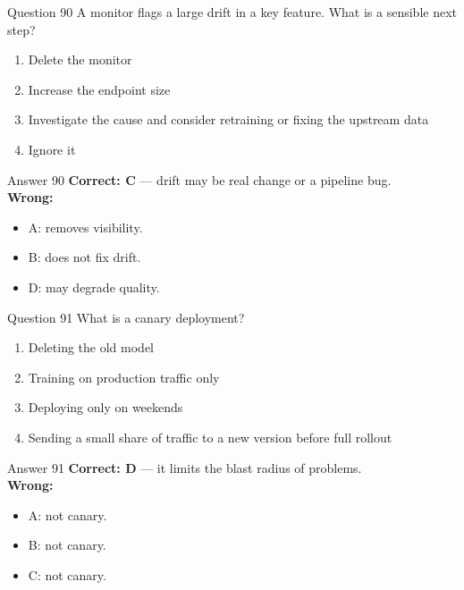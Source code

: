 \documentclass[aspectratio=169,11pt]{beamer}
\begin{document}
\begin{frame}{Question 90}
A monitor flags a large drift in a key feature. What is a sensible next step?
\begin{enumerate}[label=\Alph*.]
\item Delete the monitor
\item Increase the endpoint size
\item Investigate the cause and consider retraining or fixing the upstream data
\item Ignore it
\end{enumerate}
\end{frame}
\begin{frame}{Answer 90}
\textbf{Correct: C} --- drift may be real change or a pipeline bug.\\
\vspace{0.5em}
\textbf{Wrong:}
\begin{itemize}
\item A: removes visibility.
\item B: does not fix drift.
\item D: may degrade quality.
\end{itemize}
\end{frame}

\begin{frame}{Question 91}
What is a canary deployment?
\begin{enumerate}[label=\Alph*.]
\item Deleting the old model
\item Training on production traffic only
\item Deploying only on weekends
\item Sending a small share of traffic to a new version before full rollout
\end{enumerate}
\end{frame}
\begin{frame}{Answer 91}
\textbf{Correct: D} --- it limits the blast radius of problems.\\
\vspace{0.5em}
\textbf{Wrong:}
\begin{itemize}
\item A: not canary.
\item B: not canary.
\item C: not canary.
\end{itemize}
\end{frame}
\end{document}
